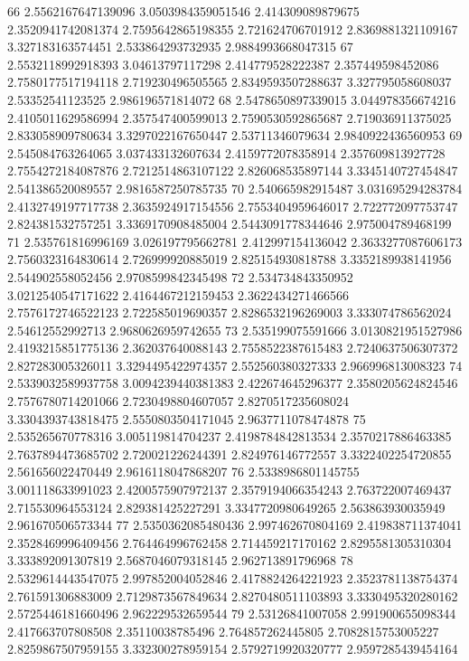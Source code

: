 66 2.5562167647139096 3.0503984359051546 2.414309089879675 2.3520941742081374 2.7595642865198355 2.721624706701912 2.8369881321109167 3.327183163574451 2.533864293732935 2.9884993668047315
67 2.5532118992918393 3.04613797117298 2.414779528222387 2.357449598452086 2.7580177517194118 2.719230496505565 2.8349593507288637 3.327795058608037 2.53352541123525 2.986196571814072
68 2.5478650897339015 3.044978356674216 2.4105011629586994 2.357547400599013 2.7590530592865687 2.719036911375025 2.833058909780634 3.3297022167650447 2.53711346079634 2.9840922436560953
69 2.545084763264065 3.037433132607634 2.4159772078358914 2.357609813927728 2.7554272184087876 2.7212514863107122 2.826068535897144 3.3345140727454847 2.541386520089557 2.9816587250785735
70 2.540665982915487 3.031695294283784 2.4132749197717738 2.3635924917154556 2.7553404959646017 2.722772097753747 2.824381532757251 3.3369170908485004 2.5443091778344646 2.975004789468199
71 2.535761816996169 3.026197795662781 2.412997154136042 2.3633277087606173 2.7560323164830614 2.726999920885019 2.825154930818788 3.3352189938141956 2.544902558052456 2.9708599842345498
72 2.534734843350952 3.0212540547171622 2.4164467212159453 2.3622434271466566 2.7576172746522123 2.722585019690357 2.8286532196269003 3.333074786562024 2.54612552992713 2.9680626959742655
73 2.535199075591666 3.0130821951527986 2.4193215851775136 2.362037640088143 2.7558522387615483 2.7240637506307372 2.827283005326011 3.3294495422974357 2.552560380327333 2.966996813008323
74 2.5339032589937758 3.0094239440381383 2.422674645296377 2.3580205624824546 2.7576780714201066 2.7230498804607057 2.8270517235608024 3.3304393743818475 2.5550803504171045 2.9637711078474878
75 2.535265670778316 3.005119814704237 2.4198784842813534 2.3570217886463385 2.7637894473685702 2.720021226244391 2.824976146772557 3.3322402254720855 2.561656022470449 2.9616118047868207
76 2.5338986801145755 3.001118633991023 2.4200575907972137 2.3579194066354243 2.763722007469437 2.715530964553124 2.829381425227291 3.3347720980649265 2.563863930035949 2.961670506573344
77 2.5350362085480436 2.997462670804169 2.419838711374041 2.3528469996409456 2.764464996762458 2.714459217170162 2.8295581305310304 3.333892091307819 2.5687046079318145 2.962713891796968
78 2.5329614443547075 2.997852004052846 2.4178824264221923 2.3523781138754374 2.761591306883009 2.7129873567849634 2.8270480511103893 3.3330495320280162 2.5725446181660496 2.962229532659544
79 2.53126841007058 2.991900655098344 2.417663707808508 2.35110038785496 2.764857262445805 2.7082815753005227 2.8259867507959155 3.332300278959154 2.5792719920320777 2.9597285439454164
